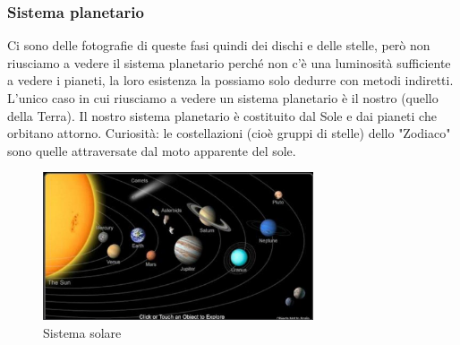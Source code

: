 \documentclass[a4paper,11pt]{article}
\begin{document}
    \subsubsection{Sistema planetario}
        Ci sono delle fotografie di queste fasi quindi dei dischi e delle stelle, però non riusciamo a vedere il sistema planetario perché non c'è una luminosità sufficiente a vedere i pianeti, la loro esistenza la possiamo solo dedurre con metodi indiretti. L'unico caso in cui riusciamo a vedere un sistema planetario è il nostro (quello della Terra).
        Il nostro sistema planetario è costituito dal Sole e dai pianeti che orbitano attorno.
        Curiosità: le costellazioni (cioè gruppi di stelle) dello "Zodiaco" sono quelle attraversate dal moto apparente del sole.
        \\
        \begin{figure}[h!!]
            \centering
                \includegraphics[width=8cm]{2dic/Sistema_Solare.jpg}
                \caption{Sistema solare}
            \label{fig:SistSol}
        \end{figure}
        \\
\end{document}
